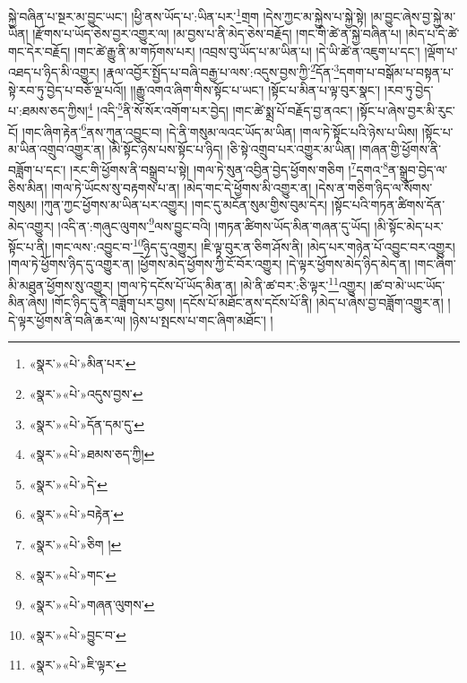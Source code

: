སྐྱེ་བཞིན་པ་སྔར་མ་བྱུང་ཡང་། །ཕྱི་ནས་ཡོད་པ་:ཡིན་པར་\footnote{«སྣར་»«པེ་»མིན་པར་}གྲག །དེས་ཀྱང་མ་སྐྱེས་པ་སྐྱེ་སྟེ། །མ་བྱུང་ཞེས་བྱ་སྐྱེ་མ་ཡིན། །རྫོགས་པ་ཡོད་ཅེས་བྱར་འགྱུར་ལ། །མ་བྱས་པ་ནི་མེད་ཅེས་བརྗོད། །གང་གི་ཚེ་ན་སྐྱེ་བཞིན་པ། །མེད་པ་དེ་ཚེ་གང་དེར་བརྗོད། །གང་ཚེ་རྒྱུ་ནི་མ་གཏོགས་པར། །འབྲས་བུ་ཡོད་པ་མ་ཡིན་པ། །དེ་ཡི་ཚེ་ན་འཇུག་པ་དང་། །ལྡོག་པ་འཐད་པ་ཉིད་མི་འགྱུར། །རྣལ་འབྱོར་སྤྱོད་པ་བཞི་བརྒྱ་པ་ལས་:འདུས་བྱས་ཀྱི་\footnote{«སྣར་»«པེ་»འདུས་བྱས་}དོན་\footnote{«སྣར་»«པེ་»དོན་དམ་དུ་}དགག་པ་བསྒོམ་པ་བསྟན་པ་སྟེ་རབ་ཏུ་བྱེད་པ་བཅོ་ལྔ་པའོ།། །།རྒྱུ་འགའ་ཞིག་གིས་སྟོང་པ་ཡང་། །སྟོང་པ་མིན་པ་ལྟ་བུར་སྣང་། །རབ་ཏུ་བྱེད་པ་:ཐམས་ཅད་ཀྱིས།\footnote{«སྣར་»«པེ་»ཐམས་ཅད་ཀྱི།} །འདི་\footnote{«སྣར་»«པེ་»དེ་}ནི་སོ་སོར་འགོག་པར་བྱེད། །གང་ཚེ་སྨྲ་པོ་བརྗོད་བྱ་ནའང་། །སྟོང་པ་ཞེས་བྱར་མི་རུང་ངོ། །གང་ཞིག་རྟེན་\footnote{«སྣར་»«པེ་»བརྟེན་}ནས་ཀུན་འབྱུང་བ། །དེ་ནི་གསུམ་ལའང་ཡོད་མ་ཡིན། །གལ་ཏེ་སྟོང་པའི་ཉེས་པ་ཡིས། །སྟོང་པ་མ་ཡིན་འགྲུབ་འགྱུར་ན། །མི་སྟོང་ཉེས་པས་སྟོང་པ་ཉིད། །ཅི་སྟེ་འགྲུབ་པར་འགྱུར་མ་ཡིན། །གཞན་གྱི་ཕྱོགས་ནི་བཟློག་པ་དང་། །རང་གི་ཕྱོགས་ནི་བསྒྲུབ་པ་སྟེ། །གལ་ཏེ་སུན་འབྱིན་བྱེད་ཕྱོགས་གཅིག །\footnote{«སྣར་»«པེ་»ཅིག །}དགའ་\footnote{«སྣར་»«པེ་»གང་}ན་སྒྲུབ་བྱེད་ལ་ཅིས་མིན། །གལ་ཏེ་ཡོངས་སུ་བརྟགས་པ་ན། །མེད་གང་དེ་ཕྱོགས་མི་འགྱུར་ན། །དེས་ན་གཅིག་ཉིད་ལ་སོགས་གསུམ། །ཀུན་ཀྱང་ཕྱོགས་མ་ཡིན་པར་འགྱུར། །གང་དུ་མངོན་སུམ་གྱིས་བུམ་དེར། །སྟོང་པའི་གཏན་ཚིགས་དོན་མེད་འགྱུར། །འདི་ན་:གཞུང་ལུགས་\footnote{«སྣར་»«པེ་»གཞན་ལུགས་}ལས་བྱུང་བའི། །གཏན་ཚིགས་ཡོད་མིན་གཞན་དུ་ཡོད། །མི་སྟོང་མེད་པར་སྟོང་པ་ནི། །གང་ལས་:འབྱུང་བ་\footnote{«སྣར་»«པེ་»བྱུང་བ་}ཉིད་དུ་འགྱུར། །ཇི་ལྟ་བུར་ན་ཅིག་ཤོས་ནི། །མེད་པར་གཉེན་པོ་འབྱུང་བར་འགྱུར། །གལ་ཏེ་ཕྱོགས་ཉིད་དུ་འགྱུར་ན། །ཕྱོགས་མེད་ཕྱོགས་ཀྱི་ངོ་བོར་འགྱུར། །དེ་ལྟར་ཕྱོགས་མེད་ཉིད་མེད་ན། །གང་ཞིག་མི་མཐུན་ཕྱོགས་སུ་འགྱུར། །གལ་ཏེ་དངོས་པོ་ཡོད་མིན་ན། །མེ་ནི་ཚ་བར་:ཅི་ལྟར་\footnote{«སྣར་»«པེ་»ཇི་ལྟར་}འགྱུར། །ཚ་བ་མེ་ཡང་ཡོད་མིན་ཞེས། །གོང་ཉིད་དུ་ནི་བཟློག་པར་བྱས། །དངོས་པོ་མཐོང་ནས་དངོས་པོ་ནི། །མེད་པ་ཞེས་བྱ་བཟློག་འགྱུར་ན། །དེ་ལྟར་ཕྱོགས་ནི་བཞི་ཆར་ལ། །ཉེས་པ་སྤངས་པ་གང་ཞིག་མཐོང་། །
